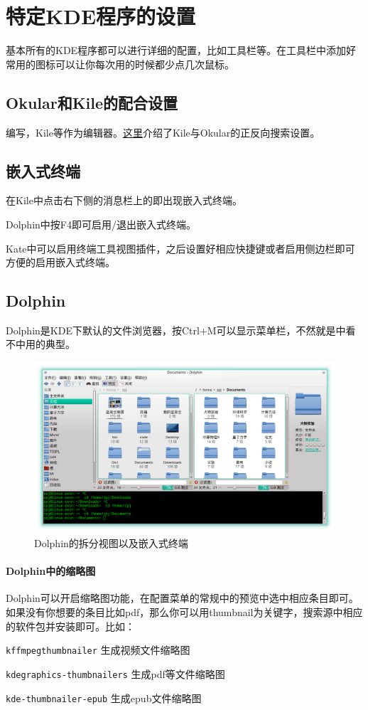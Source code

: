 \documentclass[11pt,openany]{book}
\newcommand{\soft}[1]{\texttt{\textcolor{dgreen}{#1}}}
\newcommand{\menu}[1]{\fbox{#1}}
\begin{document}
\section{特定KDE程序的设置}
基本所有的KDE程序都可以进行详细的配置，比如工具栏等。在工具栏中添加好常用的图标可以让你每次用的时候都少点几次鼠标。
\subsection{Okular和Kile的配合设置}
编写，Kile等作为编辑器。\href{http://zpj.blog.ustc.edu.cn/?p=338}{这里}介绍了Kile与Okular的正反向搜索设置。

\subsection{嵌入式终端}
在Kile中点击右下侧的消息栏上的\menu{Konsole}即出现嵌入式终端。

Dolphin中按F4即可启用/退出嵌入式终端。

Kate中可以启用终端工具视图插件，之后设置好相应快捷键或者启用侧边栏即可方便的启用嵌入式终端。
\subsection{Dolphin}
Dolphin是KDE下默认的文件浏览器，按Ctrl+M可以显示菜单栏，不然就是中看不中用的典型。
\begin{figure}[htb]
\centering
\includegraphics[width=\textwidth]{./pic/dolphin.png} 
\caption{Dolphin的拆分视图以及嵌入式终端}
\end{figure}
\paragraph{Dolphin中的缩略图} Dolphin可以开启缩略图功能，在配置菜单的常规中的预览中选中相应条目即可。如果没有你想要的条目比如pdf，那么你可以用thumbnail为关键字，搜索源中相应的软件包并安装即可。比如：
\begin{compactenum}
 \item \soft{kffmpegthumbnailer} 生成视频文件缩略图
 \item \soft{kdegraphics-thumbnailers} 生成pdf等文件缩略图
 \item \soft{kde-thumbnailer-epub} 生成epub文件缩略图
\end{compactenum}
\end{document}
